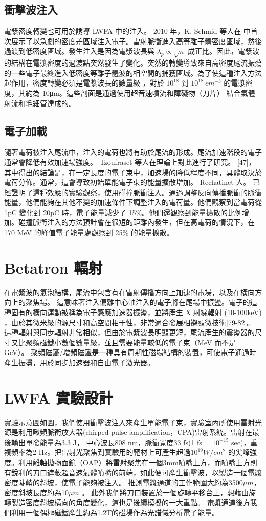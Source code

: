 \subsection{衝擊波注入}
電漿密度轉變也可用於誘導 LWFA 中的注入。 2010 年，K. Schmid 等人在\cite{PhysRevSTAB.13.091301} 中首次展示了以急劇的密度差區域注入電子。雷射脈衝進入高等離子體密度區域，然後過渡到低密度區域。發生注入是因為電漿波長與 \(\lambda_p \propto \sqrt{n}\) 成正比。因此，電漿波的結構在電漿密度的過渡點突然發生了變化。突然的轉變導致來自高密度尾流振蕩的一些電子最終進入低密度等離子體波的相空間的捕獲區域。為了使這種注入方法起作用，密度轉變必須是電漿波長的數量級 \cite{Brantov2008}，對於 \(10^{18}\) 到 \(10^{18}\ cm^{-3}\) 的電漿密度，其約為 10μm。這些剖面是通過使用超音速噴流和障礙物（刀片）\cite{Brantov2008} 結合氣體射流和毛細管達成的。
\subsection{電子加載}
隨著電荷被注入尾流中，注入的電荷也將有助於尾流的形成。尾流加速階段的電子通常會降低有效加速場強度。 Tzoufraset 等人在理論上對此進行了研究。 [47]，其中得出的結論是，在一定長度的電子束中，加速場的降低程度不同，具體取決於電荷分佈。通常，這會導致初始單能電子束的能量擴散增加。 Rechatinet 人。 \cite{Rechatin2009}已經證明了這種效應的實驗觀察，使用碰撞脈衝注入。通過調整反向傳播脈衝的脈衝能量，他們能夠在其他不變的加速條件下調整注入的電荷量。他們觀察到當電荷從 1pC 變化到 20pC 時，電子能量減少了 15\%。他們還觀察到能量擴散的比例增加。碰撞脈衝注入的方法預計會在很短的距離內發生，但在高電荷的情況下，在 170 MeV 的峰值電子能量處觀察到 25\% 的能量擴散。
\section{Betatron 輻射}
在電漿波的氣泡結構，尾流中包含有在雷射傳播方向上加速的電場，以及在橫向方向上的聚焦場。 這意味著注入偏離中心軸注入的電子將在尾場中振盪。電子的這種固有的橫向運動被稱為電子感應加速器振盪，並將產生 X 射線輻射 (10-100keV)
\cite{PhysRevLett.93} ，由於其微米級的源尺寸和高空間相干性，非常適合發展相襯顯微技術[79-82]。
 這種輻射與同步輻射非常相似，但由於電漿波長明顯更短，尾流產生的震盪器的尺寸又比聚頻磁鐵小數個數量級，並且需要能量較低的電子束（MeV 而不是 GeV）。 聚頻磁鐵/增頻磁鐵是一種具有周期性磁場結構的裝置，可使電子通過時產生振盪，用於同步加速器和自由電子激光器。
\section{LWFA 實驗設計}
 實驗示意圖如圖，我們使用衝擊波注入來產生單能電子束，實驗室內所使用雷射光源是利用啾頻脈衝放大器(chirped pulse
amplification，CPA)雷射系統\cite{Maine137}。雷射在最後輸出單發能量為3.3 J， 中心波長808 nm，脈衝寬度33 fs(1 fs = \(10^{-15}\) sec)，重複頻率為2 Hz。把雷射光聚焦到實驗用的靶材上可產生超過\(10^{19} W/cm^{2}\) 的尖峰強度。利用離軸拋物面鏡（OAP）將雷射聚焦在一個3mm噴嘴上方，而噴嘴上方則有銳利的刀口遮蔽超音速氣體噴嘴的前端，如此便可產生衝擊波，以製造一個電漿密度陡峭的斜坡，使電子能夠被注入。
推測電漿通道的工作範圍大約為3500\(\mu m\)，密度斜坡長度約為10\(\mu m\) 。
此外我們將刀口裝置於一個旋轉平移台上，想藉由旋轉製造密度斜坡橫向的角度變化，這也是後續模擬的一大重點。
電漿通道後方我們利用一個偶極磁鐵產生約為1.2T的磁場作為光譜儀分析電子能量。

